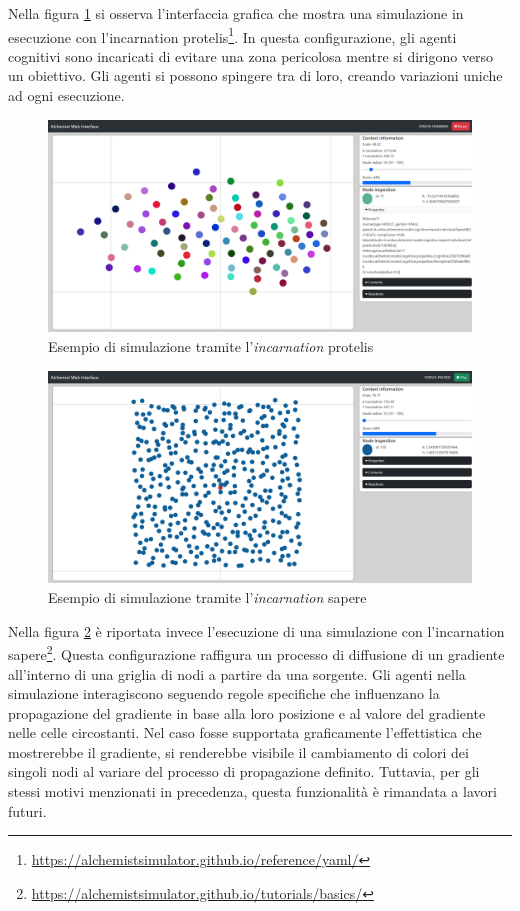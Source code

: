 Nella figura \cref{fig:protelis-example} si osserva l'interfaccia grafica che mostra una simulazione in esecuzione con l'incarnation protelis\footnote{\url{https://alchemistsimulator.github.io/reference/yaml/}}. In questa configurazione, gli agenti cognitivi sono incaricati di evitare una zona pericolosa mentre si dirigono verso un obiettivo. Gli agenti si possono spingere tra di loro, creando variazioni uniche ad ogni esecuzione.
\begin{figure}
	\centering
	\includegraphics[scale=0.22]{imgs/screens/example_protelis.png}
	\caption{Esempio di simulazione tramite l'\textit{incarnation} protelis}
	\label{fig:protelis-example}
\end{figure}
\begin{figure}
	\centering
	\includegraphics[scale=0.22]{imgs/screens/example_sapere.png}
	\caption{Esempio di simulazione tramite l'\textit{incarnation} sapere}
	\label{fig:sapere-example}
\end{figure}


Nella figura \cref{fig:sapere-example} è riportata invece l'esecuzione di una simulazione con l'incarnation sapere\footnote{\url{https://alchemistsimulator.github.io/tutorials/basics/}}. Questa configurazione raffigura un processo di diffusione di un gradiente all'interno di una griglia di nodi a partire da una sorgente. Gli agenti nella simulazione interagiscono seguendo regole specifiche che influenzano la propagazione del gradiente in base alla loro posizione e al valore del gradiente nelle celle circostanti. 
Nel caso fosse supportata graficamente l'effettistica che mostrerebbe il gradiente, si renderebbe visibile il cambiamento di colori dei singoli nodi al variare del processo di propagazione definito. Tuttavia, per gli stessi motivi menzionati in precedenza, questa funzionalità è rimandata a lavori futuri.

